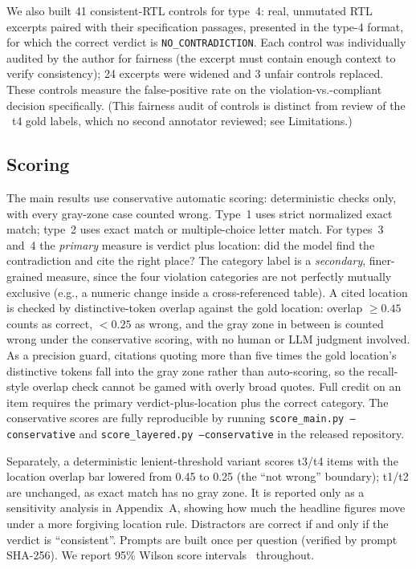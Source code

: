 \documentclass[11pt]{article}
\begin{document}
We also built 41 consistent-RTL controls for type~4: real, unmutated RTL excerpts paired with their specification passages, presented in the type-4 format, for which the correct verdict is \texttt{NO\_CONTRADICTION}. Each control was individually audited by the author for fairness (the excerpt must contain enough context to verify consistency); 24 excerpts were widened and 3 unfair controls replaced. These controls measure the false-positive rate on the violation-vs.-compliant decision specifically. (This fairness audit of controls is distinct from review of the \NTfour\ t4 gold labels, which no second annotator reviewed; see Limitations.)

\subsection{Scoring}
The main results use conservative automatic scoring: deterministic checks only, with every gray-zone case counted wrong. Type~1 uses strict normalized exact match; type~2 uses exact match or multiple-choice letter match. For types~3 and~4 the \emph{primary} measure is verdict plus location: did the model find the contradiction and cite the right place? The category label is a \emph{secondary}, finer-grained measure, since the four violation categories are not perfectly mutually exclusive (e.g., a numeric change inside a cross-referenced table). A cited location is checked by distinctive-token overlap against the gold location: overlap $\ge 0.45$ counts as correct, $< 0.25$ as wrong, and the gray zone in between is counted wrong under the conservative scoring, with no human or LLM judgment involved. As a precision guard, citations quoting more than five times the gold location's distinctive tokens fall into the gray zone rather than auto-scoring, so the recall-style overlap check cannot be gamed with overly broad quotes. Full credit on an item requires the primary verdict-plus-location plus the correct category. The conservative scores are fully reproducible by running \texttt{score\_main.py --conservative} and \texttt{score\_layered.py --conservative} in the released repository.

Separately, a deterministic lenient-threshold variant scores t3/t4 items with the location overlap bar lowered from 0.45 to 0.25 (the ``not wrong'' boundary); t1/t2 are unchanged, as exact match has no gray zone. It is reported only as a sensitivity analysis in Appendix~A, showing how much the headline figures move under a more forgiving location rule. Distractors are correct if and only if the verdict is ``consistent''. Prompts are built once per question (verified by prompt SHA-256). We report 95\% Wilson score intervals~\cite{wilson} throughout.
\end{document}

